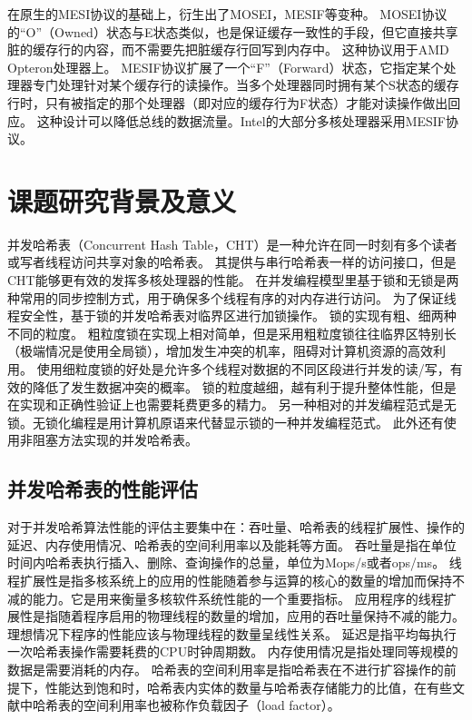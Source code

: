 在原生的MESI协议的基础上，衍生出了MOSEI，MESIF等变种。
MOSEI协议的“O”（Owned）状态与E状态类似，也是保证缓存一致性的手段，但它直接共享脏的缓存行的内容，而不需要先把脏缓存行回写到内存中。
这种协议用于AMD Opteron处理器上。
MESIF协议扩展了一个“F”（Forward）状态，它指定某个处理器专门处理针对某个缓存行的读操作。当多个处理器同时拥有某个S状态的缓存行时，只有被指定的那个处理器（即对应的缓存行为F状态）才能对读操作做出回应。
这种设计可以降低总线的数据流量。Intel的大部分多核处理器采用MESIF协议。

\section{课题研究背景及意义}

并发哈希表（Concurrent Hash Table，CHT）是一种允许在同一时刻有多个读者或写者线程访问共享对象的哈希表。
其提供与串行哈希表一样的访问接口，但是CHT能够更有效的发挥多核处理器的性能。
在并发编程模型里基于锁和无锁是两种常用的同步控制方式，用于确保多个线程有序的对内存进行访问。
为了保证线程安全性，基于锁的并发哈希表对临界区进行加锁操作。
锁的实现有粗、细两种不同的粒度。
粗粒度锁在实现上相对简单，但是采用粗粒度锁往往临界区特别长（极端情况是使用全局锁），增加发生冲突的机率，阻碍对计算机资源的高效利用。
使用细粒度锁的好处是允许多个线程对数据的不同区段进行并发的读/写，有效的降低了发生数据冲突的概率。
锁的粒度越细，越有利于提升整体性能，但是在实现和正确性验证上也需要耗费更多的精力。
另一种相对的并发编程范式是无锁。无锁化编程是用计算机原语来代替显示锁的一种并发编程范式。
此外还有使用非阻塞方法实现的并发哈希表\cite{nonblocking,clht,shalev2006split}。

\subsection{并发哈希表的性能评估}
 
对于并发哈希算法性能的评估主要集中在：吞吐量、哈希表的线程扩展性、操作的延迟、内存使用情况、哈希表的空间利用率以及能耗等方面。
吞吐量是指在单位时间内哈希表执行插入、删除、查询操作的总量，单位为Mops/s或者ops/ms。
线程扩展性是指多核系统上的应用的性能随着参与运算的核心的数量的增加而保持不减的能力。它是用来衡量多核软件系统性能的一个重要指标。
应用程序的线程扩展性是指随着程序启用的物理线程的数量的增加，应用的吞吐量保持不减的能力。
理想情况下程序的性能应该与物理线程的数量呈线性关系。
延迟是指平均每执行一次哈希表操作需要耗费的CPU时钟周期数。
内存使用情况是指处理同等规模的数据是需要消耗的内存。
哈希表的空间利用率是指哈希表在不进行扩容操作的前提下，性能达到饱和时，哈希表内实体的数量与哈希表存储能力的比值，在有些文献中哈希表的空间利用率也被称作负载因子（load factor）。

